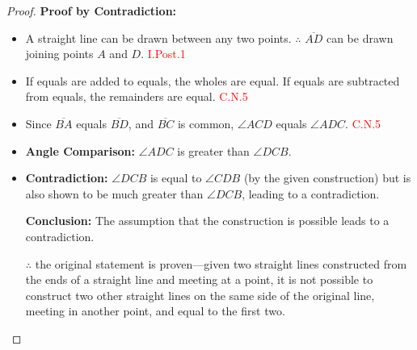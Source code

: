 \clearpage

\begin{figure}[H]
\centering
	\caption{}
\end{figure}	

\begin{proof}

\textbf{Proof by Contradiction:}
\begin{itemize}

\item A straight line can be drawn between any two points. $\therefore$ $\overline{AD}$ can be drawn joining points $A$ and $D$.\hfill\textcolor{red}{ I.Post.1}

\item If equals are added to equals, the wholes are equal. If equals are subtracted from equals, the remainders are equal.\hfill\textcolor{red}{ C.N.5}

\item Since $\overline{BA}$ equals $\overline{BD}$, and $\overline{BC}$ is common, $\angle{ACD}$ equals $\angle{ADC}$. \hfill\textcolor{red}{ C.N.5}

\item \textbf{Angle Comparison:} $\angle{ADC}$ is greater than $\angle{DCB}$.

\item \textbf{Contradiction:} $\angle{DCB}$ is equal to $\angle{CDB}$ (by the given construction) but is also shown to be much greater than $\angle{DCB}$, leading to a contradiction.

\textbf{Conclusion:} The assumption that the construction is possible leads to a contradiction.

\item[$\therefore$] the original statement is proven—given two straight lines constructed from the ends of a straight line and meeting at a point, it is not possible to construct two other straight lines on the same side of the original line, meeting in another point, and equal to the first two.

\end{itemize}

\end{proof}

\clearpage
